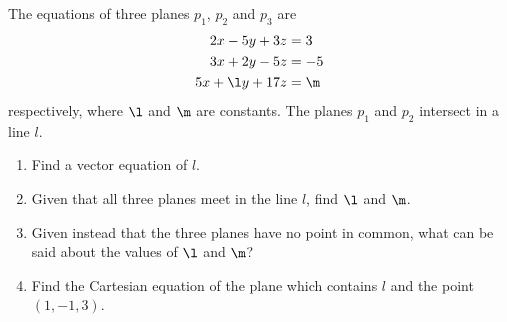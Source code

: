 \begin{problem}
    The equations of three planes $p_1$, $p_2$ and $p_3$ are
    \begin{align*}
        2x-5y+3z &= 3\\
        3x+2y-5z&=-5\\
        5x+\l y + 17z &= \m
    \end{align*}
    respectively, where $\l$ and $\m$ are constants. The planes $p_1$ and $p_2$ intersect in a line $l$.

    \begin{enumerate}
        \item Find a vector equation of $l$.
        \item Given that all three planes meet in the line $l$, find $\l$ and $\m$.
        \item Given instead that the three planes have no point in common, what can be said about the values of $\l$ and $\m$?
        \item Find the Cartesian equation of the plane which contains $l$ and the point $(1, -1, 3)$.
    \end{enumerate}
\end{problem}
